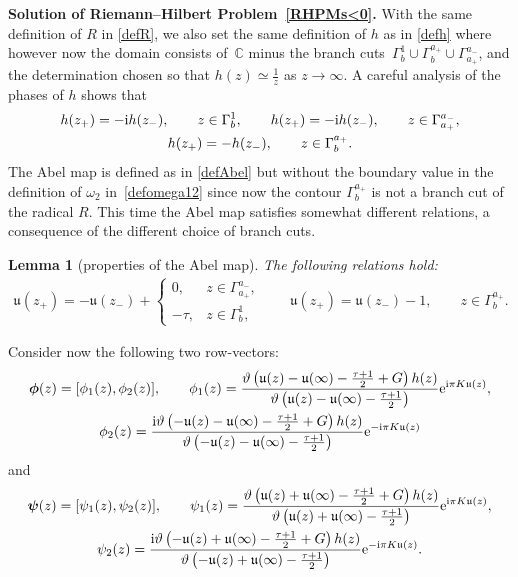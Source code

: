\documentclass[10pt,a4paper]{amsart}
\numberwithin{equation}{section}
\newtheorem{Lemma}[Theorem]{Lemma}
\theoremstyle{definition}
\def\Abel{\mathfrak u}
\def\le{\left}
\def \bs{\boldsymbol}
\def\ri{\right}
\def\nn{\nonumber}
\def\C{{\mathbb C}}
\begin{document}
{\bf Solution of Riemann--Hilbert Problem~\ref{RHPMs<0}.}
With the same definition of $R$ in \eqref{defR}, we also set the same definition of $h$ as in \eqref{defh}
where however now the domain consists of~$\C$ minus the branch cuts~${\Gamma_b^1\cup \Gamma_{b}^{a_+}\cup \Gamma_{a_+}^{a_-}}$, and the determination chosen so that $h(z) \simeq \frac 1 z $ as $z\to \infty$.
A careful analysis of the phases of $h$ shows that
\begin{gather*}
h(z_+) = -{\rm i} h(z_-),\qquad z\in \Gamma_{b}^1,\qquad
h(z_+) =-{\rm i} h(z_-),\qquad z\in \Gamma_{a_+}^{a_-},\\
h(z_+) =-h(z_-),\qquad z\in \Gamma_{b}^{a_+}.
\end{gather*}
The Abel map is defined as in \eqref{defAbel} but without the boundary value in the definition of $\omega_2$ in~\eqref{defomega12} since now the contour $\Gamma_{b}^{a_+}$ is not a branch cut of the radical $R$.
This time the Abel map satisfies somewhat different relations, a consequence of the different choice of branch cuts.
\begin{Lemma}[properties of the Abel map]
\label{lemmaAbels<0}
The following relations hold:
\begin{gather*}
\Abel(z_+)=-\Abel(z_-) +
\begin{cases}
0,& z\in \Gamma_{a_+}^{a_-},\\
-\tau, & z\in \Gamma_b^1,
\end{cases}
\qquad
\Abel(z_+) = \Abel(z_-)-1, \qquad z\in \Gamma_b^{a_+}.
\end{gather*}
\end{Lemma}
Consider now the following two row-vectors:
\begin{gather*}%
\bs \phi (z)= [\phi_1(z), \phi_2(z)],\qquad
\phi_1(z) = \frac { \vartheta\le(\Abel(z)-\Abel(\infty) - \frac {\tau+1}2 +
G\ri)h(z)}{\vartheta\le(\Abel(z)-\Abel(\infty) - \frac{\tau+1}2\ri)}{\rm e}^{{\rm i}\pi K \Abel(z)},
\nn\\
\phi_2(z) = \frac {{\rm i} \vartheta\le(-\Abel(z)-\Abel(\infty) - \frac {\tau+1}2 +
G\ri)h(z)}{\vartheta\le(-\Abel(z)-\Abel(\infty) - \frac{\tau+1}2\ri)}{\rm e}^{-{\rm i}\pi K \Abel(z)}
\end{gather*}
and
\begin{gather*}%
\bs\psi(z) = [\psi_1(z), \psi_2(z)],\qquad
\psi_1(z) = \frac { \vartheta\le(\Abel(z)+\Abel(\infty) - \frac {\tau+1}2 +
G\ri)h(z)}{\vartheta\le(\Abel(z)+\Abel(\infty) - \frac{\tau+1}2\ri)}{\rm e}^{{\rm i}\pi K \Abel(z)},
\\
\psi_2(z) = \frac {{\rm i} \vartheta\le(-\Abel(z)+\Abel(\infty) - \frac {\tau+1}2 +
G\ri)h(z)}{\vartheta\le(-\Abel(z)+\Abel(\infty) - \frac{\tau+1}2\ri)}{\rm e}^{-{\rm i}\pi K \Abel(z)}.
\end{gather*}
\end{document}
